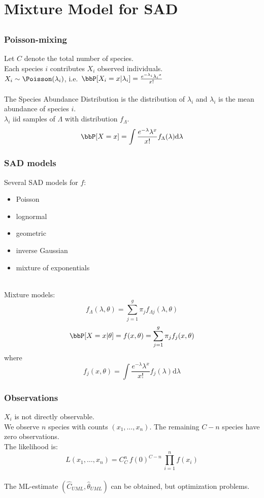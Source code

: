 \documentclass{beamer}
\begin{document}
\section{Mixture Model for SAD}
\subsection*{}

\begin{frame}\frametitle{Poisson-mixing}
Let $C$ denote the total number of species. \\
Each species $i$ contributes $X_i$ observed individuals. \\
$X_i \sim \Poisson(\lambda_i)$, i.e.\ $\bbP[X_i = x | \lambda_i] = \frac{e^{-\lambda_i} {\lambda_i}^x}{x!}$ \\
\hfill \\

The Species Abundance Distribution is the distribution of $\lambda_i$
and $\lambda_i$ is the mean abundance of species $i$. \\
$\lambda_i$ iid samples of $\Lambda$ with distribution $f_\Lambda$. \\
\[\bbP[X = x] = \int \frac{e^{-\lambda} \lambda^x}{x!} f_\Lambda(\lambda) \mathrm{d}\lambda\]

\end{frame}

\begin{frame}[shrink=10] \frametitle{SAD models}
Several SAD models for $f$:
\begin{itemize}
 \item Poisson
 \item lognormal %
 \item geometric
 \item inverse Gaussian
 \item mixture of exponentials %
\end{itemize}

\hfill \\

Mixture models:
\[ f_\Lambda(\lambda,\theta) = \sum_{j=1}^g \pi_j f_{\Lambda j} (\lambda,\theta) \]
\[ \bbP[X = x | \theta] = f(x,\theta) = \sum_{j=1}^g \pi_j f_j (x,\theta) \]
where \[f_j(x,\theta) = \int \frac{e^{-\lambda} \lambda^x}{x!} f_j(\lambda) \mathrm{d}\lambda\]

\end{frame}

\begin{frame}\frametitle{Observations}
$X_i$ is not directly observable. \\
We observe $n$ species with counts $(x_1, \ldots, x_n)$. The remaining $C - n$ species have zero observations. \\

The likelihood is:
\[ L(x_1,\ldots, x_n) = C_C^n \, {f(0)}^{C-n} \, \prod_{i=1}^{n} f(x_i) \]
\hfill \\ 
The ML-estimate $(\hat C_{UML}, \hat \theta_{UML})$ can be obtained, but optimization problems.
\end{frame}
\end{document}
